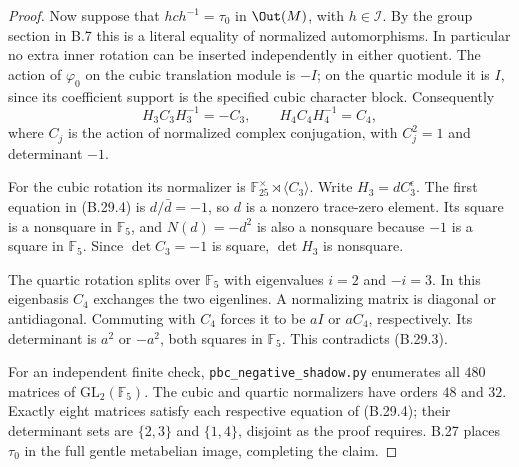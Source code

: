 \begin{proof}
Now suppose that $hc h^{-1}=\tau_0$ in $\Out(M)$,
with $h\in\mathcal I$. By the group section in B.7
this is a literal equality of normalized automorphisms.
In particular no extra inner rotation can be inserted
independently in either quotient. The action of
$\varphi_0$ on the cubic translation module is $-I$;
on the quartic module it is $I$, since its coefficient
support is the specified cubic character block.
Consequently
\[
             H_3C_3H_3^{-1}=-C_3,\qquad
             H_4C_4H_4^{-1}=C_4,
 \tag{B.29.4}
\]
where $C_j$ is the action of normalized complex
conjugation, with $C_j^2=1$ and determinant $-1$.

For the cubic rotation its normalizer is
$\mathbb F_{25}^{\times}\rtimes\langle C_3\rangle$.
Write $H_3=dC_3^\epsilon$. The first equation in
(B.29.4) is $d/\bar d=-1$, so $d$ is a nonzero
trace-zero element. Its square is a nonsquare in
$\mathbb F_5$, and
$N(d)=-d^2$ is also a nonsquare because $-1$ is
a square in $\mathbb F_5$. Since
$\det C_3=-1$ is square, $\det H_3$ is nonsquare.

The quartic rotation splits over $\mathbb F_5$ with
eigenvalues $i=2$ and $-i=3$. In this eigenbasis
$C_4$ exchanges the two eigenlines. A normalizing
matrix is diagonal or antidiagonal. Commuting with
$C_4$ forces it to be $aI$ or $aC_4$, respectively.
Its determinant is $a^2$ or $-a^2$, both squares in
$\mathbb F_5$. This contradicts (B.29.3).

For an independent finite check,
\texttt{pbc\_negative\_shadow.py} enumerates all
$480$ matrices of $\mathrm{GL}_2(\mathbb F_5)$.
The cubic and quartic normalizers have orders $48$
and $32$. Exactly eight matrices satisfy each
respective equation of (B.29.4); their determinant
sets are $\{2,3\}$ and $\{1,4\}$, disjoint as
the proof requires. B.27 places $\tau_0$ in the
full gentle metabelian image, completing the claim.
\end{proof}

